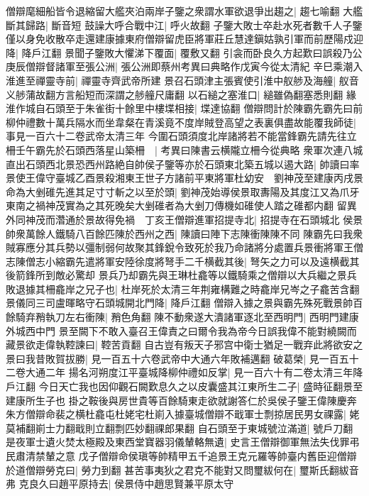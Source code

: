 僧辯麾細船皆令退縮留大艦夾泊兩岸子鑒之衆謂水軍欲退爭出趨之|{
	趨七喻翻}
大艦斷其歸路|{
	斷音短}
鼓譟大呼合戰中江|{
	呼火故翻}
子鑒大敗士卒赴水死者數千人子鑒僅以身免收散卒走還建康據東府僧辯留虎臣將軍莊丘慧達鎭姑孰引軍而前歷陽戍迎降|{
	降戶江翻}
景聞子鑒敗大懼涕下覆面|{
	覆敷又翻}
引衾而卧良久方起歎曰誤殺乃公庚辰僧辯督諸軍至張公洲|{
	張公洲即蔡州考異曰典略作戊寅今從太清紀}
辛巳乘潮入淮進至禪靈寺前|{
	禪靈寺齊武帝所建}
景召石頭津主張賓使引淮中舣䑰及海艟|{
	舣音义䑰蒲故翻方言船短而深謂之䑰艟尺庸翻}
以石縋之塞淮口|{
	縋雖偽翻塞悉則翻}
緣淮作城自石頭至于朱雀街十餘里中樓堞相接|{
	堞達協翻}
僧辯問計於陳霸先霸先曰前柳仲禮數十萬兵隔水而坐韋粲在青溪竟不度岸賊登高望之表裏俱盡故能覆我師徒|{
	事見一百六十二卷武帝太清三年}
今圍石頭須度北岸諸將若不能當鋒霸先請先往立柵壬午霸先於石頭西落星山築柵　|{
	考異曰陳書云横隴立柵今從典略}
衆軍次連八城直出石頭西北景恐西州路絶自帥侯子鑒等亦於石頭東北築五城以遏大路|{
	帥讀曰率}
景使王偉守臺城乙酉景殺湘東王世子方諸前平東將軍杜幼安　劉神茂至建康丙戌景命為大剉碓先進其足寸寸斬之以至於頭|{
	劉神茂始導侯景取夀陽及其度江又為爪牙東南之禍神茂實為之其死晚矣大剉碓者為大剉刀傳機如碓使人踏之碓都内翻}
留異外同神茂而濳通於景故得免禍　丁亥王僧辯進軍招提寺北|{
	招提寺在石頭城北}
侯景帥衆萬餘人鐵騎八百餘匹陳於西州之西|{
	陳讀曰陣下志陳衝陳陳不同}
陳霸先曰我衆賊寡應分其兵勢以彊制弱何故聚其鋒銳令致死於我乃命諸將分處置兵景衝將軍王僧志陳僧志小縮霸先遣將軍安陸徐度將弩手二千横截其後|{
	弩矢之力可以及遠横截其後箭鋒所到敵必驚却}
景兵乃却霸先與王琳杜龕等以鐵騎乘之僧辯以大兵繼之景兵敗退據其柵龕岸之兄子也|{
	杜岸死於太清三年荆雍構難之時龕岸兄岑之子龕苦含翻}
景儀同三司盧暉略守石頭城開北門降|{
	降戶江翻}
僧辯入據之景與霸先殊死戰景帥百餘騎弃矟執刀左右衝陳|{
	矟色角翻}
陳不動衆遂大潰諸軍逐北至西明門|{
	西明門建康外城西中門}
景至闕下不敢入臺召王偉責之曰爾令我為帝今日誤我偉不能對繞闕而藏景欲走偉執鞚諫曰|{
	鞚苦貢翻}
自古豈有叛天子邪宫中衛士猶足一戰弃此將欲安之景曰我昔敗賀拔勝|{
	見一百五十六卷武帝中大通六年敗補邁翻}
破葛榮|{
	見一百五十二卷大通二年}
揚名河朔度江平臺城降柳仲禮如反掌|{
	見一百六十有二卷太清三年降戶江翻}
今日天亡我也因仰觀石闕歎息久之以皮囊盛其江東所生二子|{
	盛時征翻景至建康所生子也}
掛之鞍後與房世貴等百餘騎東走欲就謝答仁於吳侯子鑒王偉陳慶奔朱方僧辯命裴之横杜龕屯杜姥宅杜崱入據臺城僧辯不戢軍士剽掠居民男女祼露|{
	姥莫補翻崱士力翻戢則立翻剽匹妙翻祼郎果翻}
自石頭至于東城號泣滿道|{
	號戶刀翻}
是夜軍士遺火焚太極殿及東西堂寶器羽儀輦輅無遺|{
	史言王僧辯御軍無法失伐罪弔民肅清禁輦之意}
戊子僧辯命侯瑱等帥精甲五千追景王克元羅等帥臺内舊臣迎僧辯於道僧辯勞克曰|{
	勞力到翻}
甚苦事夷狄之君克不能對又問璽紱何在|{
	璽斯氏翻紱音弗}
克良久曰趙平原持去|{
	侯景侍中趙思賢兼平原太守}
